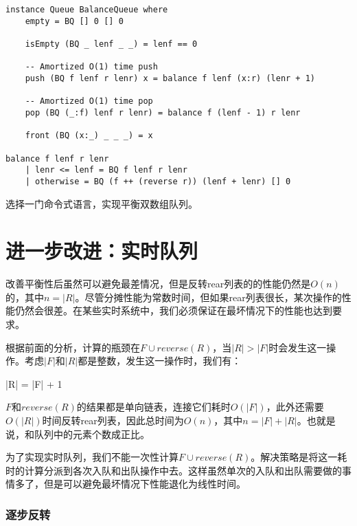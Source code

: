\documentclass[UTF8]{article}
\begin{document}
\lstset{language=Haskell}
\begin{lstlisting}[style=Haskell]
instance Queue BalanceQueue where
    empty = BQ [] 0 [] 0

    isEmpty (BQ _ lenf _ _) = lenf == 0

    -- Amortized O(1) time push
    push (BQ f lenf r lenr) x = balance f lenf (x:r) (lenr + 1)

    -- Amortized O(1) time pop
    pop (BQ (_:f) lenf r lenr) = balance f (lenf - 1) r lenr

    front (BQ (x:_) _ _ _) = x

balance f lenf r lenr
    | lenr <= lenf = BQ f lenf r lenr
    | otherwise = BQ (f ++ (reverse r)) (lenf + lenr) [] 0
\end{lstlisting}

\begin{Exercise}
选择一门命令式语言，实现平衡双数组队列。
\end{Exercise}

\section{进一步改进：实时队列}

改善平衡性后虽然可以避免最差情况，但是反转rear列表的的性能仍然是$O(n)$的，其中$n = |R|$。尽管分摊性能为常数时间，但如果rear列表很长，某次操作的性能仍然会很差。在某些实时系统中，我们必须保证在最坏情况下的性能也达到要求。

根据前面的分析，计算的瓶颈在$ F \cup reverse(R)$，当$|R| > |F|$时会发生这一操作。考虑$|F|$和$|R|$都是整数，发生这一操作时，我们有：

\be
  |R| = |F| + 1
\ee

$F$和$reverse(R)$的结果都是单向链表，连接它们耗时$O(|F|)$，此外还需要$O(|R|)$时间反转rear列表，因此总时间为$O(n)$，其中$n = |F| + |R|$。也就是说，和队列中的元素个数成正比。

为了实现实时队列，我们不能一次性计算$ F \cup reverse(R)$。解决策略是将这一耗时的计算分派到各次入队和出队操作中去。这样虽然单次的入队和出队需要做的事情多了，但是可以避免最坏情况下性能退化为线性时间。

\subsubsection{逐步反转}
\end{document}

